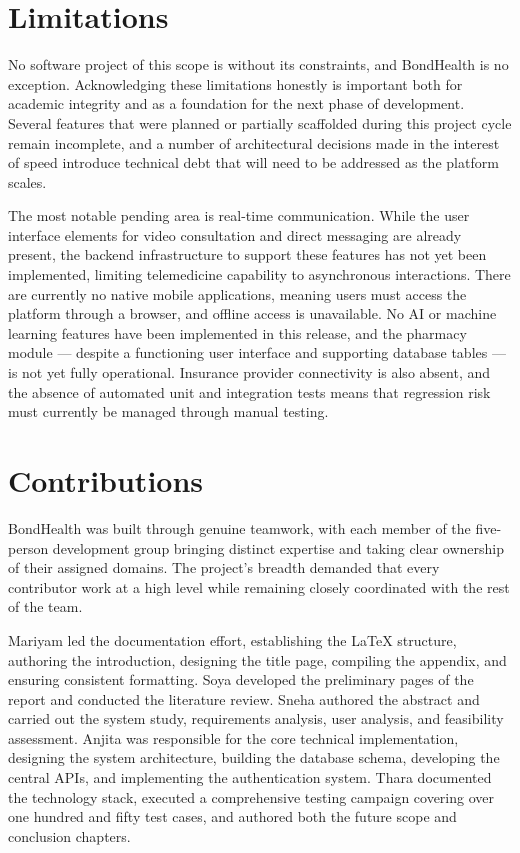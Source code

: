 \section{Limitations}

\noindent No software project of this scope is without its constraints, and BondHealth is no exception. Acknowledging these limitations honestly is important both for academic integrity and as a foundation for the next phase of development. Several features that were planned or partially scaffolded during this project cycle remain incomplete, and a number of architectural decisions made in the interest of speed introduce technical debt that will need to be addressed as the platform scales.

\noindent The most notable pending area is real-time communication. While the user interface elements for video consultation and direct messaging are already present, the backend infrastructure to support these features has not yet been implemented, limiting telemedicine capability to asynchronous interactions. There are currently no native mobile applications, meaning users must access the platform through a browser, and offline access is unavailable. No AI or machine learning features have been implemented in this release, and the pharmacy module --- despite a functioning user interface and supporting database tables --- is not yet fully operational. Insurance provider connectivity is also absent, and the absence of automated unit and integration tests means that regression risk must currently be managed through manual testing.

\section{Contributions}

\noindent BondHealth was built through genuine teamwork, with each member of the five-person development group bringing distinct expertise and taking clear ownership of their assigned domains. The project's breadth demanded that every contributor work at a high level while remaining closely coordinated with the rest of the team.

\noindent Mariyam led the documentation effort, establishing the LaTeX structure, authoring the introduction, designing the title page, compiling the appendix, and ensuring consistent formatting. Soya developed the preliminary pages of the report and conducted the literature review. Sneha authored the abstract and carried out the system study, requirements analysis, user analysis, and feasibility assessment. Anjita was responsible for the core technical implementation, designing the system architecture, building the database schema, developing the central APIs, and implementing the authentication system. Thara documented the technology stack, executed a comprehensive testing campaign covering over one hundred and fifty test cases, and authored both the future scope and conclusion chapters.

